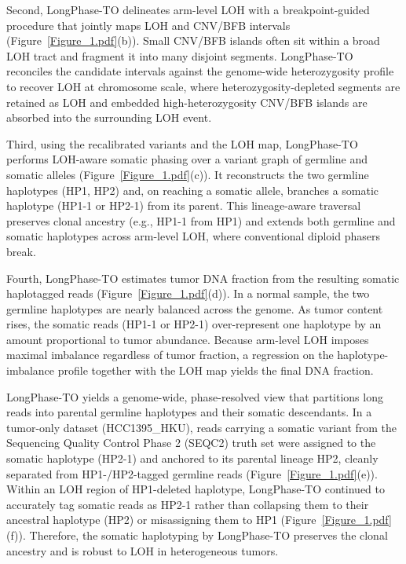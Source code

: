 \documentclass[pdflatex,sn-nature]{sn-jnl}
\begin{document}
Second, LongPhase-TO delineates arm-level LOH with a breakpoint-guided procedure that jointly maps LOH and CNV/BFB intervals (Figure~\ref{Figure_1.pdf}(b)). Small CNV/BFB islands often sit within a broad LOH tract and fragment it into many disjoint segments. LongPhase-TO reconciles the candidate intervals against the genome-wide heterozygosity profile to recover LOH at chromosome scale, where heterozygosity-depleted segments are retained as LOH and embedded high-heterozygosity CNV/BFB islands are absorbed into the surrounding LOH event.

Third, using the recalibrated variants and the LOH map, LongPhase-TO performs LOH-aware somatic phasing over a variant graph of germline and somatic alleles (Figure~\ref{Figure_1.pdf}(c)). It reconstructs the two germline haplotypes (HP1, HP2) and, on reaching a somatic allele, branches a somatic haplotype (HP1-1 or HP2-1) from its parent. This lineage-aware traversal preserves clonal ancestry (e.g., HP1-1 from HP1) and extends both germline and somatic haplotypes across arm-level LOH, where conventional diploid phasers break.

Fourth, LongPhase-TO estimates tumor DNA fraction from the resulting somatic haplotagged reads (Figure~\ref{Figure_1.pdf}(d)). In a normal sample, the two germline haplotypes are nearly balanced across the genome. As tumor content rises, the somatic reads (HP1-1 or HP2-1) over-represent one haplotype by an amount proportional to tumor abundance. Because arm-level LOH imposes maximal imbalance regardless of tumor fraction, a regression on the haplotype-imbalance profile together with the LOH map yields the final DNA fraction.

LongPhase-TO yields a genome-wide, phase-resolved view that partitions long reads into parental germline haplotypes and their somatic descendants. In a tumor-only dataset (HCC1395\_HKU), reads carrying a somatic variant from the Sequencing Quality Control Phase 2 (SEQC2) truth set were assigned to the somatic haplotype (HP2-1) and anchored to its parental lineage HP2, cleanly separated from HP1-/HP2-tagged germline reads (Figure~\ref{Figure_1.pdf}(e)). Within an LOH region of HP1-deleted haplotype, LongPhase-TO continued to accurately tag somatic reads as HP2-1 rather than collapsing them to their ancestral haplotype (HP2) or misassigning them to HP1 (Figure~\ref{Figure_1.pdf}(f)). Therefore, the somatic haplotyping by LongPhase-TO preserves the clonal ancestry and is robust to LOH in heterogeneous tumors.
\end{document}
